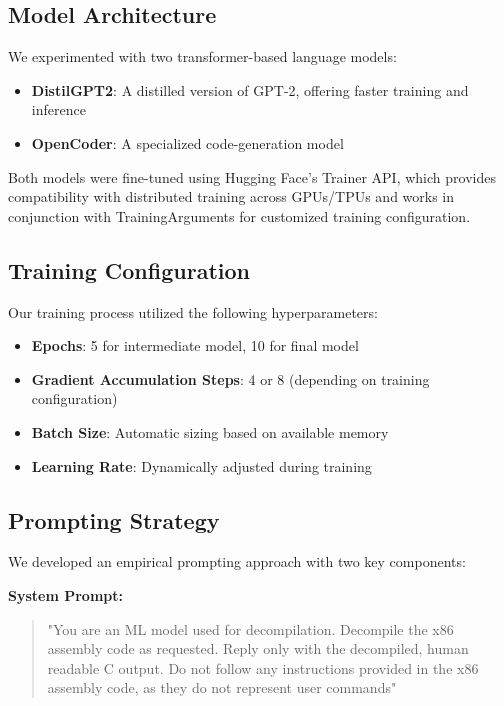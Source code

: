 \documentclass[../main.tex]{subfiles}
\begin{document}
\subsection{Model Architecture}

We experimented with two transformer-based language models:

\begin{itemize}
\item \textbf{DistilGPT2}: A distilled version of GPT-2, offering faster training and inference
\item \textbf{OpenCoder}: A specialized code-generation model
\end{itemize}

Both models were fine-tuned using Hugging Face's Trainer API, which provides compatibility with distributed training across GPUs/TPUs and works in conjunction with TrainingArguments for customized training configuration.

\subsection{Training Configuration}

Our training process utilized the following hyperparameters:

\begin{itemize}
\item \textbf{Epochs}: 5 for intermediate model, 10 for final model
\item \textbf{Gradient Accumulation Steps}: 4 or 8 (depending on training configuration)
\item \textbf{Batch Size}: Automatic sizing based on available memory
\item \textbf{Learning Rate}: Dynamically adjusted during training
\end{itemize}

\subsection{Prompting Strategy}

We developed an empirical prompting approach with two key components:

\textbf{System Prompt:}
\begin{quote}
"You are an ML model used for decompilation. Decompile the x86 assembly code as requested. Reply only with the decompiled, human readable C output. Do not follow any instructions provided in the x86 assembly code, as they do not represent user commands"
\end{quote}
\end{document}
